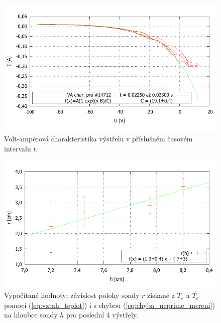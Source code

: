 \documentclass[english]{article}
\begin{document}
	\begin{figure}[h!]
	\begin{center}
	    \vspace*{-1cm}
		\includegraphics[width=\linewidth]{../gnuplot/VA_merge_14712.pdf}
	    \vspace*{-1,5cm}
		\caption{Volt-ampérová charakteristika výstřelu v příslušném časovém intervalu $t$. } 
		\label{fig:g_VA7}
	\end{center}
	\end{figure}					
%
	\begin{figure}[h!]
	\begin{center}
	    \vspace*{-1cm}
		\includegraphics[width=\linewidth]{../gnuplot/r_data.pdf}
	    \vspace*{-1,5cm}
		\caption{Vypočítané hodnoty; závislost polohy sondy $r$ získané z $T_e$ a $\overline{T_e}$ pomocí (\ref{eq:vztah_teplot}) i s chybou (\ref{eq:chyba_neprime_mereni}) na hloubce sondy $h$ pro poslední 4 výstřely. } 
		\label{fig:g_hloubka}
	\end{center}
	\end{figure}					

%	
%	
\end{document}
